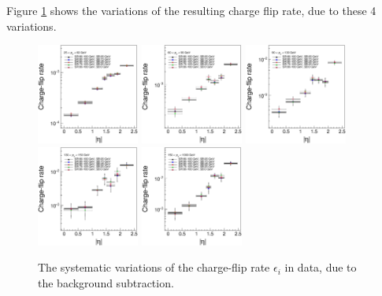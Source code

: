 Figure \ref{fig:charge_flip_sys_background_subtraction} shows the variations of the resulting charge flip rate, due to these 4 variations.
\begin{figure}
\centering
\includegraphics[width=0.3\textwidth]{data/plot/charge_flip/FitPlots/data_cf_comparison_0.eps}
\includegraphics[width=0.3\textwidth]{data/plot/charge_flip/FitPlots/data_cf_comparison_1.eps}
\includegraphics[width=0.3\textwidth]{data/plot/charge_flip/FitPlots/data_cf_comparison_2.eps} \\
\includegraphics[width=0.3\textwidth]{data/plot/charge_flip/FitPlots/data_cf_comparison_3.eps}
\includegraphics[width=0.3\textwidth]{data/plot/charge_flip/FitPlots/data_cf_comparison_4.eps}
\caption{The systematic variations of the charge-flip rate $\epsilon_i$ in data, due to the background subtraction.}
\label{fig:charge_flip_sys_background_subtraction}
\end{figure}

